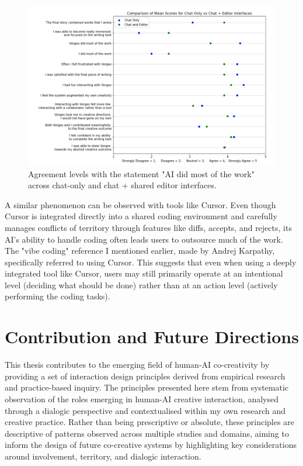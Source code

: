 \begin{figure}
\centering
\includegraphics[width=1\linewidth]{graphsharedspaces.png}
\caption{Agreement levels with the statement "AI did most of the work" across chat-only and chat + shared editor interfaces.}
\label{fig:graphsharedspaces}
\end{figure}

A similar phenomenon can be observed with tools like Cursor. Even though Cursor is integrated directly into a shared coding environment and carefully manages conflicts of territory through features like diffs, accepts, and rejects, its AI's ability to handle coding often leads users to outsource much of the work. The "vibe coding" reference I mentioned earlier, made by Andrej Karpathy, specifically referred to using Cursor. This suggests that even when using a deeply integrated tool like Cursor, users may still primarily operate at an intentional level (deciding what should be done) rather than at an action level (actively performing the coding tasks).

\section{Contribution and Future Directions}

This thesis contributes to the emerging field of human-AI co-creativity by providing a set of interaction design principles derived from empirical research and practice-based inquiry. The principles presented here stem from systematic observation of the roles emerging in human-AI creative interaction, analysed through a dialogic perspective and contextualised within my own research and creative practice. Rather than being prescriptive or absolute, these principles are descriptive of patterns observed across multiple studies and domains, aiming to inform the design of future co-creative systems by highlighting key considerations around involvement, territory, and dialogic interaction.


